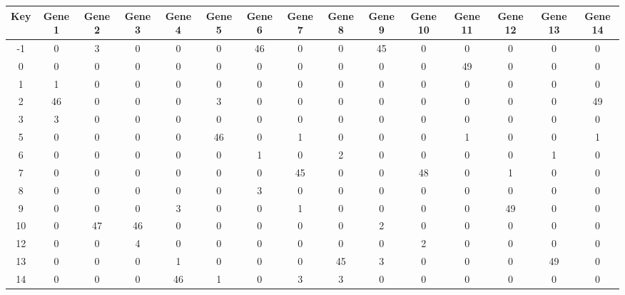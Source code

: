 \begin{tabular}{|c|c|c|c|c|c|c|c|c|c|c|c|c|c|c|}
\hline
Key & Gene 1 & Gene 2 & Gene 3 & Gene 4 & Gene 5 & Gene 6 & Gene 7 & Gene 8 & Gene 9 & Gene 10 & Gene 11 & Gene 12 & Gene 13 & Gene 14 \\
\hline
-1 & 0 & 3 & 0 & 0 & 0 & 46 & 0 & 0 & 45 & 0 & 0 & 0 & 0 & 0 \\
0 & 0 & 0 & 0 & 0 & 0 & 0 & 0 & 0 & 0 & 0 & 49 & 0 & 0 & 0 \\
1 & 1 & 0 & 0 & 0 & 0 & 0 & 0 & 0 & 0 & 0 & 0 & 0 & 0 & 0 \\
2 & 46 & 0 & 0 & 0 & 3 & 0 & 0 & 0 & 0 & 0 & 0 & 0 & 0 & 49 \\
3 & 3 & 0 & 0 & 0 & 0 & 0 & 0 & 0 & 0 & 0 & 0 & 0 & 0 & 0 \\
5 & 0 & 0 & 0 & 0 & 46 & 0 & 1 & 0 & 0 & 0 & 1 & 0 & 0 & 1 \\
6 & 0 & 0 & 0 & 0 & 0 & 1 & 0 & 2 & 0 & 0 & 0 & 0 & 1 & 0 \\
7 & 0 & 0 & 0 & 0 & 0 & 0 & 45 & 0 & 0 & 48 & 0 & 1 & 0 & 0 \\
8 & 0 & 0 & 0 & 0 & 0 & 3 & 0 & 0 & 0 & 0 & 0 & 0 & 0 & 0 \\
9 & 0 & 0 & 0 & 3 & 0 & 0 & 1 & 0 & 0 & 0 & 0 & 49 & 0 & 0 \\
10 & 0 & 47 & 46 & 0 & 0 & 0 & 0 & 0 & 2 & 0 & 0 & 0 & 0 & 0 \\
12 & 0 & 0 & 4 & 0 & 0 & 0 & 0 & 0 & 0 & 2 & 0 & 0 & 0 & 0 \\
13 & 0 & 0 & 0 & 1 & 0 & 0 & 0 & 45 & 3 & 0 & 0 & 0 & 49 & 0 \\
14 & 0 & 0 & 0 & 46 & 1 & 0 & 3 & 3 & 0 & 0 & 0 & 0 & 0 & 0 \\
\hline
\end{tabular}